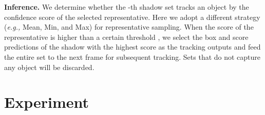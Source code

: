 \documentclass{article}
\begin{document}
\textbf{Inference.} We determine whether the -th shadow set tracks an object by the confidence score of the selected representative. Here we adopt a different strategy  (\textit{e.g., } Mean, Min, and Max) for representative sampling. When the score of the representative is higher than a certain threshold  , we select the box and score predictions of the shadow with the highest score as the tracking outputs and feed the entire set to the next frame for subsequent tracking. Sets that do not capture any object will be discarded. 

















\section{Experiment}
\end{document}
